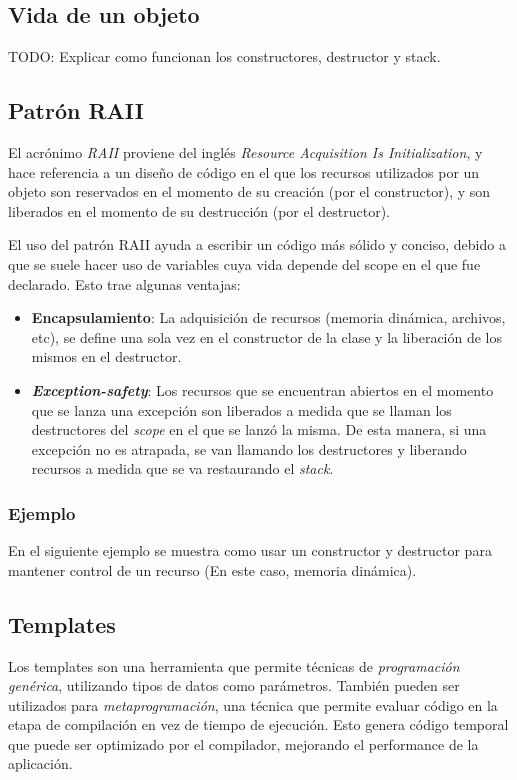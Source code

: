 \documentclass[a4paper, twoside]{article}
\newcommand{\codedir}{../resources/code} %
\begin{document}
\subsection{Vida de un objeto}
TODO: Explicar como funcionan los constructores, destructor y stack.

\subsection{Patrón RAII}
El acrónimo \emph{RAII} proviene del inglés \emph{Resource Acquisition Is Initialization}, y hace referencia a un diseño de código en el que los recursos utilizados por un objeto son reservados en el momento de su creación (por el constructor), y son liberados en el momento de su destrucción (por el destructor).

El uso del patrón RAII ayuda a escribir un código más sólido y conciso, debido a que se suele hacer uso de variables cuya vida depende del scope en el que fue declarado. Esto trae algunas ventajas:

\begin{itemize}
	\item \textbf{Encapsulamiento}: La adquisición de recursos (memoria dinámica, archivos, etc), se define una sola vez en el constructor de la clase y la liberación de los mismos en el destructor.
	\item \emph{\textbf{Exception-safety}}: Los recursos que se encuentran abiertos en el momento que se lanza una excepción son liberados a medida que se llaman los destructores del \emph{scope} en el que se lanzó la misma. De esta manera, si una excepción no es atrapada, se van llamando los destructores y liberando recursos a medida que se va restaurando el \emph{stack}.
\end{itemize}

\newpage
\subsubsection{Ejemplo}
En el siguiente ejemplo se muestra como usar un constructor y destructor para mantener control de un recurso (En este caso, memoria dinámica).



\subsection{Templates}
Los templates son una herramienta que permite técnicas de \emph{programación genérica}, utilizando tipos de datos como parámetros. También pueden ser utilizados para \emph{metaprogramación}, una técnica que permite evaluar código en la etapa de compilación en vez de tiempo de ejecución. Esto genera código temporal que puede ser optimizado por el compilador, mejorando el performance de la aplicación.
\end{document}
